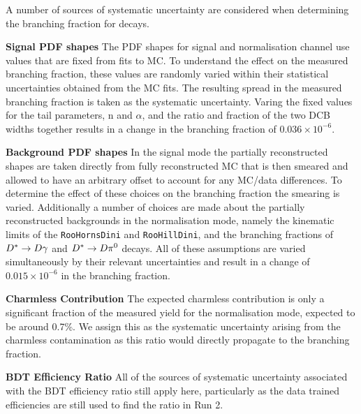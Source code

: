 A number of sources of systematic uncertainty are considered when determining the branching fraction for \decay{\Bp}{\Dsp\Kp\Km} decays.
{\color{Blue}
\begin{description}
\item \textbf{Signal PDF shapes} The PDF shapes for signal and normalisation channel use values that are fixed from fits to MC. To understand the effect on the measured branching fraction, these values are randomly varied within their statistical uncertainties obtained from the MC fits. The resulting spread in the measured branching fraction is taken as the systematic uncertainty. Varing the fixed values for the tail parameters, n and $\alpha$, and the ratio and fraction of the two DCB widths together results in a change in the branching fraction of $0.036\times 10^{-6}$.

\item \textbf{Background PDF shapes} In the signal mode the partially reconstructed shapes are taken directly from fully reconstructed MC that is then smeared and allowed to have an arbitrary offset to account for any MC/data differences. To determine the effect of these choices on the branching fraction the smearing is varied. Additionally a number of choices are made about the partially reconstructed backgrounds in the normalisation mode, namely the kinematic limits of the \texttt{RooHornsDini} and \texttt{RooHillDini}, and the branching fractions of ${D}^{*} \rightarrow {\ensuremath{D}} \gamma $ and ${D}^{*} \rightarrow {\ensuremath{D}} \pi^{0} $ decays. All of these assumptions are varied simultaneously by their relevant uncertainties and result in a change of $0.015\times10^{-6}$ in the branching fraction.

\item \textbf{Charmless Contribution} The expected charmless contribution is only a significant fraction of the measured yield for the normalisation mode, expected to be around 0.7\%. We assign this as the systematic uncertainty arising from the charmless contamination as this ratio would directly propagate to the branching fraction.

\item \textbf{BDT Efficiency Ratio} All of the sources of systematic uncertainty associated with the BDT efficiency ratio still apply here, particularly as the data trained efficiencies are still used to find the ratio in Run 2. 


\end{description}}
